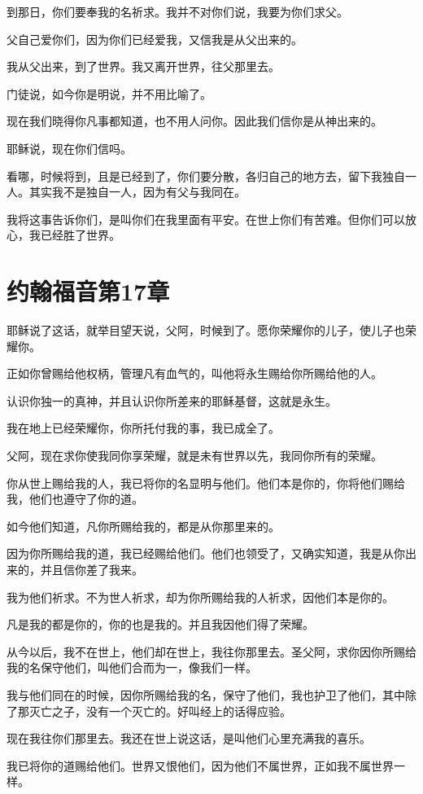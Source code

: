 \documentclass[12pt,oneside]{book}
\begin{document}
到那日，你们要奉我的名祈求。我并不对你们说，我要为你们求父。

父自己爱你们，因为你们已经爱我，又信我是从父出来的。

我从父出来，到了世界。我又离开世界，往父那里去。

门徒说，如今你是明说，并不用比喻了。

现在我们晓得你凡事都知道，也不用人问你。因此我们信你是从神出来的。

耶稣说，现在你们信吗。

看哪，时候将到，且是已经到了，你们要分散，各归自己的地方去，留下我独自一人。其实我不是独自一人，因为有父与我同在。

我将这事告诉你们，是叫你们在我里面有平安。在世上你们有苦难。但你们可以放心，我已经胜了世界。

\chapter{约翰福音第17章}
耶稣说了这话，就举目望天说，父阿，时候到了。愿你荣耀你的儿子，使儿子也荣耀你。

正如你曾赐给他权柄，管理凡有血气的，叫他将永生赐给你所赐给他的人。

认识你独一的真神，并且认识你所差来的耶稣基督，这就是永生。

我在地上已经荣耀你，你所托付我的事，我已成全了。

父阿，现在求你使我同你享荣耀，就是未有世界以先，我同你所有的荣耀。

你从世上赐给我的人，我已将你的名显明与他们。他们本是你的，你将他们赐给我，他们也遵守了你的道。

如今他们知道，凡你所赐给我的，都是从你那里来的。

因为你所赐给我的道，我已经赐给他们。他们也领受了，又确实知道，我是从你出来的，并且信你差了我来。

我为他们祈求。不为世人祈求，却为你所赐给我的人祈求，因他们本是你的。

凡是我的都是你的，你的也是我的。并且我因他们得了荣耀。

从今以后，我不在世上，他们却在世上，我往你那里去。圣父阿，求你因你所赐给我的名保守他们，叫他们合而为一，像我们一样。

我与他们同在的时候，因你所赐给我的名，保守了他们，我也护卫了他们，其中除了那灭亡之子，没有一个灭亡的。好叫经上的话得应验。

现在我往你们那里去。我还在世上说这话，是叫他们心里充满我的喜乐。

我已将你的道赐给他们。世界又恨他们，因为他们不属世界，正如我不属世界一样。
\end{document}
